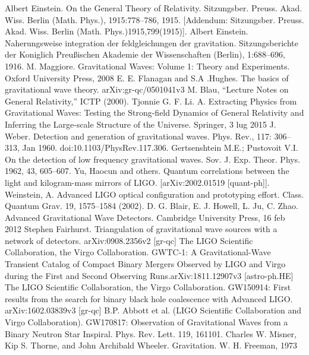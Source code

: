 \documentclass[binding=0.6cm, LaM]{sapthesis}
\begin{document}
\begin{thebibliography}{500}

	 Albert Einstein. On the General Theory of Relativity. Sitzungsber. Preuss. Akad. Wiss. Berlin (Math. Phys.), 1915:778–786, 1915. [Addendum: Sitzungsber. Preuss. Akad. Wiss. Berlin (Math. Phys.)1915,799(1915)]. 
	 Albert Einstein. Naherungsweise integration der feldgleichungen der gravitation. Sitzungsberichte der Koniglich Preu{\ss}ischen Akademie der Wissenschaften (Berlin), 1:688–696, 1916. 
	 M. Maggiore. Gravitational Waves: Volume 1: Theory and Experiments. Oxford University Press, 2008
	 E. E. Flanagan and S.A .Hughes. The basics of gravitational wave theory. arXiv:gr-qc/0501041v3
	 M. Blau, “Lecture Notes on General Relativity,” ICTP (2000). 
	 Tjonnie G. F. Li. A. Extracting Physics from Gravitational Waves: Testing the Strong-field Dynamics of General Relativity and Inferring the Large-scale Structure of the Universe. Springer, 3 lug 2015	
	 J. Weber. Detection and generation of gravitational waves. Phys. Rev., 117: 306–313, Jan 1960. doi:10.1103/PhysRev.117.306. 
	 Gertsenshtein M.E.; Pustovoit V.I. On the detection of low frequency gravitational waves. Sov. J. Exp. Theor. Phys. 1962, 43, 605–607. 
	 Yu, Haocun and others. Quantum correlations between the light and kilogram-mass mirrors of LIGO. [arXiv:2002.01519 [quant-ph]].
	 Weinstein, A. Advanced LIGO optical configuration and prototyping effort. Class. Quantum Grav. 19, 1575–1584 (2002).
	 D. G. Blair, E. J. Howell, L. Ju, C. Zhao. Advanced Gravitational Wave Detectors. Cambridge University Press, 16 feb 2012 
	 Stephen Fairhurst. Triangulation of gravitational wave sources with a network of detectors. arXiv:0908.2356v2 [gr-qc]
	 The LIGO Scientific Collaboration, the Virgo Collaboration. GWTC-1: A Gravitational-Wave Transient Catalog of Compact Binary Mergers Observed by LIGO and Virgo during the First and Second Observing Runs.arXiv:1811.12907v3 [astro-ph.HE]
	 The LIGO Scientific Collaboration, the Virgo Collaboration. GW150914: First results from the search for binary black hole coalescence with Advanced LIGO. arXiv:1602.03839v3 [gr-qc]
         B.P. Abbott et al. (LIGO Scientific Collaboration and Virgo Collaboration). GW170817: Observation of Gravitational Waves from a Binary Neutron Star Inspiral. Phys. Rev. Lett. 119, 161101.	
	 Charles W. Misner, Kip S. Thorne, and John Archibald Wheeler. Gravitation. W. H. Freeman, 1973

\end{thebibliography}
\end{document}
